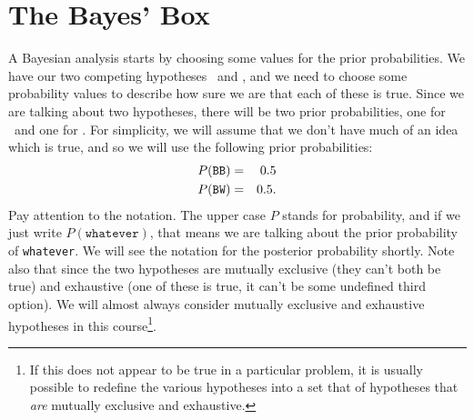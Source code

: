 \section{The Bayes' Box}
A Bayesian analysis starts by choosing some values for the prior probabilities.
We have our two competing hypotheses \bb~and \bw, and we need to choose some
probability values to describe how sure we are that each of these is true.
Since we are talking about two hypotheses, there will be two prior probabilities,
one for \bb~and one for \bw.
For simplicity, we will assume that we don't have much of an idea which is true,
and so we will use the following prior probabilities:
\begin{eqnarray}
P(\texttt{BB}) &=& 0.5\\
P(\texttt{BW}) &=& 0.5.
\end{eqnarray}
Pay attention to the notation. The upper case $P$ stands for probability, and if we just
write $P(\texttt{whatever})$, that means we are talking about the
prior probability of {\tt whatever}. We will see the notation for the posterior probability
shortly. Note also that since the two hypotheses are mutually exclusive
(they can't both be true) and exhaustive (one of these is true, it can't be
some undefined third option).
We will almost always consider mutually exclusive and exhaustive hypotheses in
this course\footnote{If this does not appear to be true in a particular problem,
it is usually possible to redefine the various hypotheses into a set that of
hypotheses that {\it are}
mutually exclusive and exhaustive.}.

